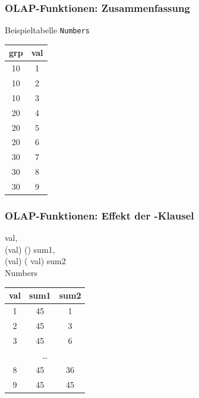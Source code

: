     \begin{frame}
    
      \frametitle{OLAP-Funktionen: Zusammenfassung}
    
    Beispieltabelle \texttt{Numbers}
    
    \begin{center}
      \begin{tabular}{|c|c|}
      \hline
      \rowcolor{Gray} grp & val \\
      \hline \hline
      10 & 1 \\
      10 & 2 \\
      10 & 3 \\
      20 & 4 \\
      20 & 5 \\
      20 & 6 \\
      30 & 7 \\
      30 & 8 \\
      30 & 9 \\
      \hline
      \end{tabular}
      \end{center}
    
    \end{frame}
    
    
    
    \begin{frame}
    
    \frametitle{OLAP-Funktionen: Effekt der -Klausel}
    
    \begin{sql}
       val, \\
      \1 (val) ()  sum1, \\
      \1 (val) ( val)  sum2 \\
       Numbers
    \end{sql}
    
    \begin{center}
      \begin{tabular}{|c|c|c|}
      \hline
      \rowcolor{Gray} val & sum1 & sum2 \\
      \hline \hline
      1 & 45 & 1 \\
      2 & 45 & 3 \\
      3 & 45 & 6 \\
      \multicolumn{3}{|c|}{\dots} \\
      8 & 45 & 36 \\
      9 & 45 & 45 \\
      \hline
      \end{tabular}
      \end{center}
    
    \end{frame}
    
